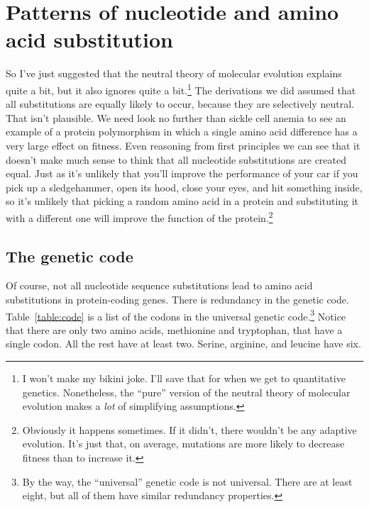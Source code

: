 \chapter{Patterns of nucleotide and amino acid substitution}

So I've just suggested that the neutral theory of molecular evolution
explains quite a bit, but it also ignores quite a bit.\footnote{I
  won't make my bikini joke. I'll save that for when we get to
  quantitative genetics. Nonetheless, the ``pure'' version of the
  neutral theory of molecular evolution makes a {\it lot\/} of
  simplifying assumptions.} The derivations we did assumed that all
substitutions are equally likely to occur, because they are
selectively neutral. That isn't plausible. We need look no further
than sickle cell anemia to see an example of a protein polymorphism in
which a single amino acid difference has a very large effect on
fitness. Even reasoning from first principles we can see that it
doesn't make much sense to think that all nucleotide substitutions are
created equal. Just as it's unlikely that you'll improve the
performance of your car if you pick up a sledgehammer, open its hood,
close your eyes, and hit something inside, so it's unlikely that
picking a random amino acid in a protein and substituting it with a
different one will improve the function of the
protein.\footnote{Obviously it happens sometimes. If it didn't, there
  wouldn't be any adaptive evolution. It's just that, on average,
  mutations are more likely to decrease fitness than to increase
  it. }

\section*{The genetic code}

Of course, not all nucleotide sequence substitutions lead to amino
acid substitutions in protein-coding genes. There is redundancy in the
genetic code. Table~\ref{table:code} is a list of the codons in the
universal genetic code.\footnote{By the way, the ``universal'' genetic
  code is not universal. There are at least eight, but all of them
  have similar redundancy properties.} Notice that there are only two
amino acids, methionine and tryptophan, that have a single codon. All the
rest have at least two. Serine, arginine, and leucine have
six.


